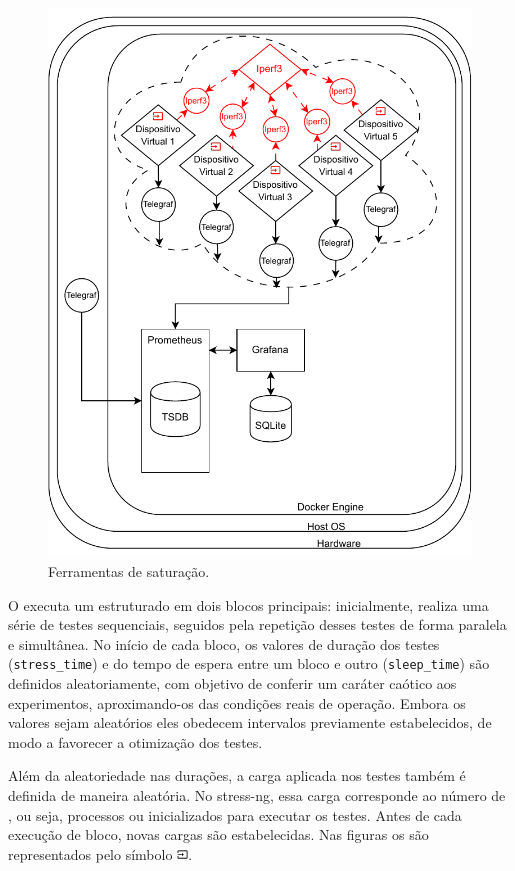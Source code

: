 \begin{figure}[H]
\centering
\includegraphics[scale=1]{Imagens/chap03/by-blocks/saturation_diagram.pdf}
\caption{Ferramentas de saturação.}
\label{fig:DiagramaSaturacao}
\end{figure}

O  executa um  estruturado em dois blocos principais: inicialmente, realiza uma série de testes sequenciais, seguidos pela repetição desses testes de forma paralela e simultânea. No início de cada bloco, os valores de duração dos testes (\verb|stress_time|) e do tempo de espera entre um bloco e outro (\verb|sleep_time|) são definidos aleatoriamente, com objetivo de conferir um caráter caótico aos experimentos, aproximando-os das condições reais de operação. Embora os valores sejam aleatórios eles obedecem intervalos previamente estabelecidos, de modo a favorecer a otimização dos testes.

Além da aleatoriedade nas durações, a carga aplicada nos testes também é definida de maneira aleatória. No stress-ng, essa carga corresponde ao número de , ou seja, processos ou  inicializados para executar os testes. Antes de cada execução de bloco, novas cargas são estabelecidas. Nas figuras os  são representados pelo símbolo \includegraphics[height=0.8em]{Imagens/chap03/input_black.png}.

